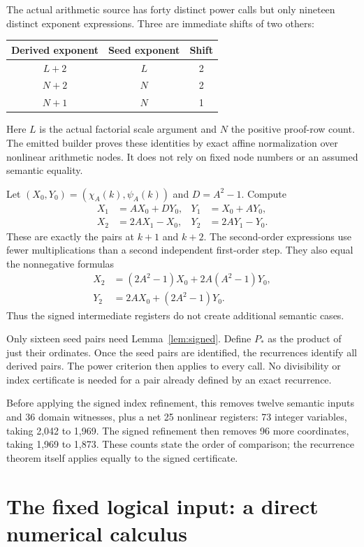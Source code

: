 \documentclass[11pt]{article}
\theoremstyle{definition}
\theoremstyle{remark}
\begin{document}
The actual arithmetic source has forty distinct power calls but only
nineteen distinct exponent expressions. Three are immediate shifts of
two others:
\begin{center}
\begin{tabular}{ccc}
\toprule
Derived exponent & Seed exponent & Shift\\
\midrule
$L+2$ & $L$ & 2\\
$N+2$ & $N$ & 2\\
$N+1$ & $N$ & 1\\
\bottomrule
\end{tabular}
\end{center}
Here $L$ is the actual factorial scale argument and $N$ the positive
proof-row count. The emitted builder proves these identities by exact
affine normalization over nonlinear arithmetic nodes. It does not rely
on fixed node numbers or an assumed semantic equality.

Let $(X_0,Y_0)=(\chi_A(k),\psi_A(k))$ and $D=A^2-1$. Compute
\begin{align*}
 X_1&=AX_0+DY_0,&Y_1&=X_0+AY_0,\\
 X_2&=2AX_1-X_0,&Y_2&=2AY_1-Y_0.
\end{align*}
These are exactly the pairs at $k+1$ and $k+2$.
The second-order expressions use fewer multiplications than a second
independent first-order step. They also equal the nonnegative formulas
\begin{align*}
 X_2&=(2A^2-1)X_0+2A(A^2-1)Y_0,\\
 Y_2&=2AX_0+(2A^2-1)Y_0.
\end{align*}
Thus the signed intermediate registers do not create additional
semantic cases.

Only sixteen seed pairs need Lemma~\ref{lem:signed}. Define $P_*$ as
the product of just their ordinates. Once the seed pairs are identified,
the recurrences identify all derived pairs. The power criterion then
applies to every call. No divisibility or index certificate is needed
for a pair already defined by an exact recurrence.

Before applying the signed index refinement, this removes twelve
semantic inputs and 36 domain witnesses, plus a net 25 nonlinear
registers: 73 integer variables, taking 2,042 to 1,969. The signed
refinement then removes 96 more coordinates, taking 1,969 to 1,873.
These counts state the order of comparison; the recurrence theorem
itself applies equally to the signed certificate.

\section{The fixed logical input: a direct numerical calculus}
\end{document}
